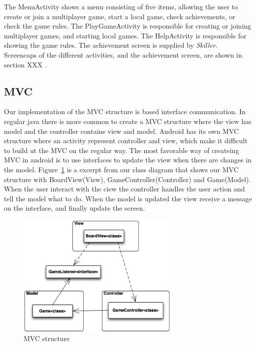 The MenuActivity shows a menu consisting of five items, allowing the user to create or join a multiplayer game, start a local game, check achievements, or check the game rules. The PlayGameActivity is responsible for creating or joining multiplayer games, and starting local games. The HelpActivity is responsible for showing the game rules. The achievement screen is supplied by \emph{Skiller}.\\

Screencaps of the different activities, and the achievement screen, are shown in section XXX .

\subsection{MVC}

Our implementation of the MVC structure is based interface communication. In regular java there is more common to create a MVC structure where the view has model and the controller contains view and model. Android has its own MVC structure where an activity represent controller and view, which make it difficult to build ut the MVC on the regular way. The most favorable way of createing MVC in android is to use interfaces to update the view when there are changes in the model. Figure~\ref{fig:mvc} is a excerpt from our class diagram that shows our MVC structure with BoardView(View), GameController(Controller) and Game(Model). When the user interact with the ciew the controller handles the user action and tell the model what to do. When the model is updated the view receive a message on the interface, and finally update the screen.


\begin{figure}[H]
\begin{center}
\includegraphics[width=0.7\textwidth]{Images/mvc}
\caption{MVC structure}
\label{fig:mvc}
\end{center}
\end{figure}






